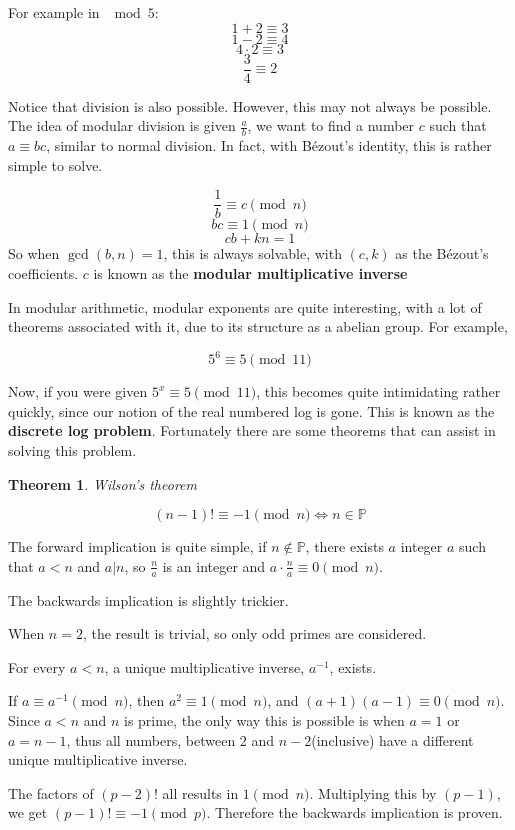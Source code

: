 \documentclass{report}
\newtheorem{theorem}{Theorem}[section]
\begin{document}
For example in $\mod5$:
$$1+2\equiv3$$
$$1-2\equiv4$$
$$4\cdot2\equiv3$$
$$\frac{3}{4}\equiv2$$

Notice that division is also possible. However, this may not always be possible. The idea of modular division is given $\frac{a}{b}$, we want to find a number $c$ such that $a\equiv bc$, similar to normal division. In fact, with B\'ezout's identity, this is rather simple to solve.

$$\frac{1}{b}\equiv c\pmod n$$
$$bc\equiv 1\pmod n$$
$$cb+kn=1$$
So when $\gcd(b,n)=1$, this is always solvable, with $(c,k)$ as the B\'ezout's coefficients. $c$ is known as the \textbf{modular multiplicative inverse}

In modular arithmetic, modular exponents are quite interesting, with a lot of theorems associated with it, due to its structure as a abelian group. For example,

$$5^6\equiv5\pmod11$$

Now, if you were given $5^x\equiv5\pmod11$, this becomes quite intimidating rather quickly, since our notion of the real numbered log is gone. This is known as the \textbf{discrete log problem}. Fortunately there are some theorems that can assist in solving this problem. 

\begin{theorem}
	Wilson's theorem
	
	$$(n-1)!\equiv-1\pmod n\Leftrightarrow n\in\mathbb{P}$$
\end{theorem}

The forward implication is quite simple, if $n\notin\mathbb{P}$, there exists $a$ integer $a$ such that $a<n$ and $a|n$, so $\frac{n}{a}$ is an integer and $a\cdot\frac{n}{a}\equiv0\pmod n$.

The backwards implication is slightly trickier. 

When $n=2$, the result is trivial, so only odd primes are considered.

For every $a<n$, a unique multiplicative inverse, $a^{-1}$, exists. 

If $a\equiv a^{-1}\pmod n$, then $a^2\equiv 1\pmod n$, and $(a+1)(a-1)\equiv 0\pmod n$. Since $a<n$ and $n$ is prime, the only way this is possible is when $a=1$ or $a=n-1$, thus all numbers, between $2$ and $n-2$(inclusive) have a different unique multiplicative inverse.

The factors of $(p-2)!$ all results in $1\pmod n$. Multiplying this by $(p-1)$, we get $(p-1)!\equiv-1\pmod p$. Therefore the backwards implication is proven.
\end{document}
